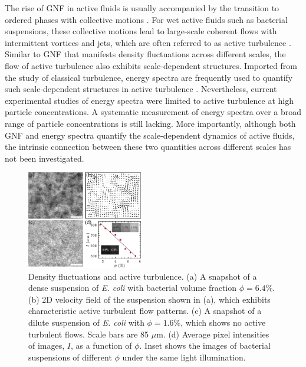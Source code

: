 \documentclass[twocolumn,aps,prx,amsmath,amssymb,longbibliography,superscriptaddress]{revtex4-2}
\begin{document}
The rise of GNF in active fluids is usually accompanied by the transition to ordered phases with collective motions \cite{Ramaswamy2010,Marchetti2013}. For wet active fluids such as bacterial suspensions, these collective motions lead to large-scale coherent flows with intermittent vortices and jets, which are often referred to as active turbulence \cite{Wolgemuth2008,Wensink2012,Dunkel2013a,Bratanov2015,Guo2018,Linkmann2019,Bardfalvy2019,Alert2020,Skultety2020,Peng2020}. Similar to GNF that manifests density fluctuations across different scales, the flow of active turbulence also exhibits scale-dependent structures. Imported from the study of classical turbulence, energy spectra are frequently used to quantify such scale-dependent structures in active turbulence \cite{Ishikawa2011,Wensink2012,Dunkel2013a,Giomi2015,Creppy2015,Patteson2018,Alert2020}. Nevertheless, current experimental studies of energy spectra were limited to active turbulence at high particle concentrations. A systematic measurement of energy spectra over a broad range of particle concentrations is still lacking. More importantly, although both GNF and energy spectra quantify the scale-dependent dynamics of active fluids, the intrinsic connection between these two quantities across different scales has not been investigated.
%
\begin{figure}[t]
	\begin{center}
		\includegraphics[width=0.45\textwidth]{Figures/fig-1.pdf}
		\caption[Experimental details]
		{Density fluctuations and active turbulence.
			(a) A snapshot of a dense suspension of \textit{E. coli} with bacterial volume fraction $\phi = 6.4\%$.
			(b) 2D velocity field of the suspension shown in (a), which exhibits characteristic active turbulent flow patterns.
			(c) A snapshot of a dilute suspension of \textit{E. coli} with $\phi = 1.6\%$, which shows no active turbulent flows. Scale bars are 85 $\mu$m.
			(d) Average pixel intensities of images, $I$, as a function of $\phi$. Inset shows the images of bacterial suspensions of different $\phi$ under the same light illumination.
		}
		\label{fig:experiment}
	\end{center}
\end{figure}
\end{document}
